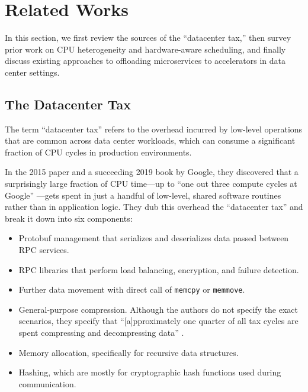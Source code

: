 \section{Related Works}

In this section, we first review the sources of the “datacenter tax,” then survey prior work on CPU heterogeneity and hardware-aware scheduling, and finally discuss existing approaches to offloading microservices to accelerators in data center settings.

\subsection{The Datacenter Tax}

The term ``datacenter tax'' refers to the overhead incurred by low-level operations that are common across data center workloads, which can consume a significant fraction of CPU cycles in production environments.

In the 2015 paper \cite{kanev2015profiling} and a succeeding 2019 book \cite{barrosoDatacenterComputer2019} by Google, they discovered that a surprisingly large fraction of CPU time---up to ``one out three compute cycles at Google'' \cite[p. 165]{barrosoDatacenterComputer2019}---gets spent in just a handful of low-level, shared software routines rather than in application logic. They dub this overhead the ``datacenter tax'' and break it down into six components:

\begin{itemize}
    \item Protobuf management that serializes and deserializes data passed between RPC services.
    \item RPC libraries that perform load balancing, encryption, and failure detection.
    \item Further data movement with direct call of \texttt{memcpy} or \texttt{memmove}.
    \item General-purpose compression. Although the authors do not specify the exact scenarios, they specify that ``[a]pproximately one quarter of all tax cycles are spent compressing and decompressing data'' \cite[p. 162]{kanev2015profiling}.
    \item Memory allocation, specifically for recursive data structures.
    \item Hashing, which are mostly for cryptographic hash functions used during communication.
\end{itemize}


